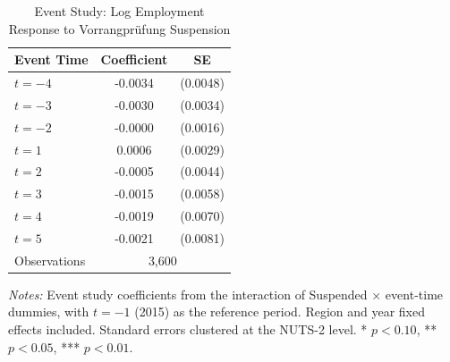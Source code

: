 \begin{table}[H]
\centering
\caption{Event Study: Log Employment Response to Vorrangpr\"ufung Suspension}
\label{tab:eventstudy}
\begin{threeparttable}
\begin{tabular}{lcc}
\toprule
Event Time & Coefficient & SE \\
\midrule
$t = -4$ & -0.0034 & (0.0048) \\
$t = -3$ & -0.0030 & (0.0034) \\
$t = -2$ & -0.0000 & (0.0016) \\
$t = 1$ & 0.0006 & (0.0029) \\
$t = 2$ & -0.0005 & (0.0044) \\
$t = 3$ & -0.0015 & (0.0058) \\
$t = 4$ & -0.0019 & (0.0070) \\
$t = 5$ & -0.0021 & (0.0081) \\
\midrule
Observations & \multicolumn{2}{c}{3,600} \\
\bottomrule
\end{tabular}
\begin{tablenotes}[flushleft]
\footnotesize
\item \textit{Notes:} Event study coefficients from the interaction of Suspended $\times$ event-time dummies, with $t = -1$ (2015) as the reference period. Region and year fixed effects included. Standard errors clustered at the NUTS-2 level. * $p<0.10$, ** $p<0.05$, *** $p<0.01$.
\end{tablenotes}
\end{threeparttable}
\end{table}
